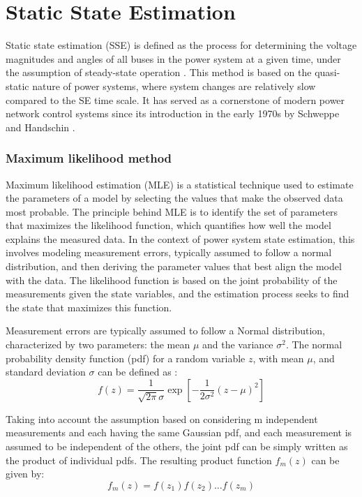\section{Static State Estimation}\label{sec:ch1/sec4}

Static state estimation (SSE) is defined as the process for determining the voltage magnitudes and angles of all buses in the power system at a given time, under the assumption of steady-state operation \autocite{Phadke12008springer}. This method is based on the quasi-static nature of power systems, where system changes are relatively slow compared to the SE time scale. It has served as a cornerstone of modern power network control systems since its introduction in the early 1970s by Schweppe and Handschin \autocite{4074022}. 

\subsubsection{Maximum likelihood method}

Maximum likelihood estimation (MLE) is a statistical technique used to estimate the parameters of a model by selecting the values that make the observed data most probable. The principle behind MLE is to identify the set of parameters that maximizes the likelihood function, which quantifies how well the model explains the measured data. In the context of power system state estimation, this involves modeling measurement errors, typically assumed to follow a normal distribution, and then deriving the parameter values that best align the model with the data. The likelihood function is based on the joint probability of the measurements given the state variables, and the estimation process seeks to find the state that maximizes this function. 

Measurement errors are typically assumed to follow a Normal distribution, characterized by two parameters: the mean $\mu$ and the variance $\sigma^2$. The normal probability density function (pdf) for a random variable $z$, with mean $\mu$, and standard deviation $\sigma$ can be defined as \autocite{Abur2004}:
\begin{equation}
    f(z)=\frac{1}{\sqrt{2 \pi} \sigma} \exp \left[-\frac{1}{2 \sigma^{2}}\left(z-\mu\right)^{2}\right]
\end{equation}

Taking into account the assumption based on considering m independent measurements and each having the same Gaussian pdf, and each measurement is assumed to be independent of the others, the joint pdf can be simply written as the product of individual pdfs. The resulting  product function $f_m(z)$ can be given by:
\begin{equation}
    f_{m}(z)=f\left(z_{1}\right) f\left(z_{2}\right) \ldots f\left(z_{m}\right)
\end{equation}

